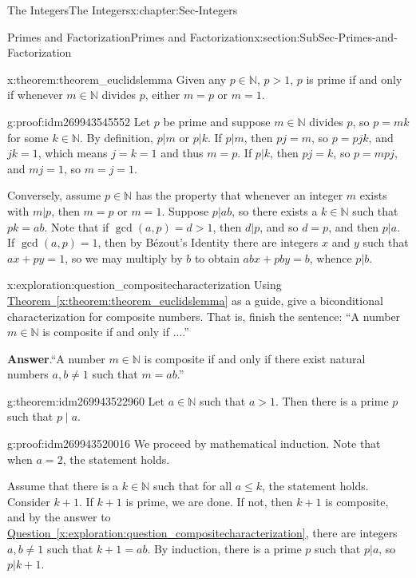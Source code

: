 \documentclass[oneside,10pt,]{book}
\numberwithin{equation}{section}
\renewcommand{\le}{\leqslant}
\def\N{{\mathbb N}}
\begin{document}
\begin{chapterptx}{The Integers}{}{The Integers}{}{}{x:chapter:Sec-Integers}
\begin{sectionptx}{Primes and Factorization}{}{Primes and Factorization}{}{}{x:section:SubSec-Primes-and-Factorization}
\begin{theorem}{}{}{x:theorem:theorem_euclidslemma}%
Given any \(p\in \N\), \(p > 1\), \(p\) is prime if and only if whenever \(m\in \N\) divides \(p\), either \(m = p\) or \(m = 1\).%
\end{theorem}
\begin{proofptx}{}{g:proof:idm269943545552}
Let \(p\) be prime and suppose \(m\in \N\) divides \(p\), so \(p = mk\) for some \(k\in \N\). By definition, \(p|m\) or \(p|k\). If \(p|m\), then \(pj = m\), so \(p = pjk\), and \(jk=1\), which means \(j=k=1\) and thus \(m=p\). If \(p|k\), then \(pj=k\), so \(p = mpj\), and \(mj=1\), so \(m = j = 1\).%
\par
Conversely, assume \(p\in \N\) has the property that whenever an integer \(m\) exists with \(m|p\), then \(m= p\) or \(m =1\). Suppose \(p|ab\), so there exists a \(k\in\N\) such that \(pk = ab\). Note that if \(\gcd(a,p) = d > 1\), then \(d|p\), and so \(d = p\), and then \(p|a\). If \(\gcd(a,p) = 1\), then by Bézout's Identity there are integers \(x\) and \(y\) such that \(ax + py = 1\), so we may multiply by \(b\) to obtain \(abx + pby = b\), whence \(p|b\).%
\end{proofptx}
\begin{exploration}{}{x:exploration:question_compositecharacterization}%
Using \hyperref[x:theorem:theorem_euclidslemma]{Theorem~\ref{x:theorem:theorem_euclidslemma}} as a guide, give a biconditional characterization for composite numbers. That is, finish the sentence: ``A number \(m\in\N\) is composite if and only if ....''%
\par\smallskip%
\noindent\textbf{Answer}.\hypertarget{g:answer:idm269943525664}{}\quad{}``A number \(m\in\N\) is composite if and only if there exist natural numbers \(a,b\ne 1\) such that \(m = ab\).''%
\end{exploration}
\begin{theorem}{}{}{g:theorem:idm269943522960}%
Let \(a\in \N\) such that \(a > 1\). Then there is a prime \(p\) such that \(p\mid a\).%
\end{theorem}
\begin{proofptx}{}{g:proof:idm269943520016}
We proceed by mathematical induction. Note that when \(a = 2\), the statement holds.%
\par
Assume that there is a \(k\in\N\) such that for all \(a\le k\), the statement holds. Consider \(k+1\). If \(k+1\) is prime, we are done. If not, then \(k+1\) is composite, and by the answer to \hyperref[x:exploration:question_compositecharacterization]{Question~\ref{x:exploration:question_compositecharacterization}}, there are integers \(a,b\ne 1\) such that \(k+1 = ab\). By induction, there is a prime \(p\) such that \(p|a\), so \(p|k+1\).%

\end{proofptx}
\end{sectionptx}
\end{chapterptx}
\end{document}
